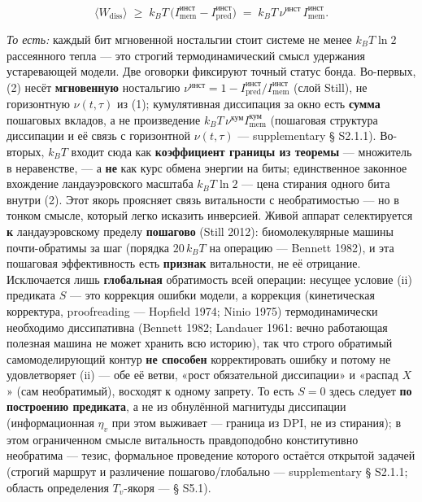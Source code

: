 \documentclass[pdflatex,sn-mathphys-ay]{sn-jnl}
\begin{document}
\begin{equation}\langle W_{\text{diss}} \rangle \;\ge\; k_B T\,\big(I_{\text{mem}}^{\text{инст}} - I_{\text{pred}}^{\text{инст}}\big)
  \;=\; k_B T\,\nu^{\text{инст}}\,I_{\text{mem}}^{\text{инст}}. \tag{2}\end{equation}

\emph{То есть:} каждый бит мгновенной ностальгии стоит системе не менее \(k_B T \ln 2\) рассеянного тепла --- это строгий термодинамический смысл удержания устаревающей модели. Две оговорки фиксируют точный статус бонда. Во-первых, (2) несёт \textbf{мгновенную} ностальгию \(\nu^{\text{инст}} = 1 - I_{\text{pred}}^{\text{инст}}/I_{\text{mem}}^{\text{инст}}\) (слой Still), не горизонтную \(\nu(t,\tau)\) из (1); кумулятивная диссипация за окно есть \textbf{сумма} пошаговых вкладов, а не произведение \(k_B T\,\nu^{\text{кум}} I_{\text{mem}}^{\text{кум}}\) (пошаговая структура диссипации и её связь с горизонтной \(\nu(t,\tau)\) --- supplementary § S2.1.1). Во-вторых, \(k_B T\) входит сюда как \textbf{коэффициент границы из теоремы} --- множитель в неравенстве, --- а \textbf{не} как курс обмена энергии на биты; единственное законное вхождение ландауэровского масштаба \(k_B T \ln 2\) --- цена стирания одного бита внутри (2). Этот якорь проясняет связь витальности с необратимостью --- но в тонком смысле, который легко исказить инверсией. Живой аппарат селектируется \textbf{к} ландауэровскому пределу \textbf{пошагово} (Still 2012): биомолекулярные машины почти-обратимы за шаг (порядка \(20\,k_B T\) на операцию --- Bennett 1982), и эта пошаговая эффективность есть \textbf{признак} витальности, не её отрицание. Исключается лишь \textbf{глобальная} обратимость всей операции: несущее условие (ii) предиката \(S\) --- это коррекция ошибки модели, а коррекция (кинетическая корректура, proofreading --- Hopfield 1974; Ninio 1975) термодинамически необходимо диссипативна (Bennett 1982; Landauer 1961: вечно работающая полезная машина не может хранить всю историю), так что строго обратимый самомоделирующий контур \textbf{не способен} корректировать ошибку и потому не удовлетворяет (ii) --- обе её ветви, «рост обязательной диссипации» и «распад \(X\)» (сам необратимый), восходят к одному запрету. То есть \(S = 0\) здесь следует \textbf{по построению предиката}, а не из обнулённой магнитуды диссипации (информационная \(\eta_v\) при этом выживает --- граница из DPI, не из стирания); в этом ограниченном смысле витальность правдоподобно конститутивно необратима --- тезис, формальное проведение которого остаётся открытой задачей (строгий маршрут и различение пошагово/глобально --- supplementary § S2.1.1; область определения \(T_v\)-якоря --- § S5.1).
\end{document}
